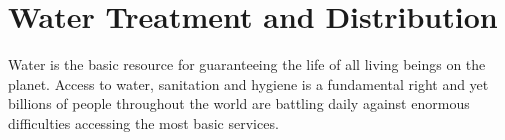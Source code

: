 
\chapter{Water Treatment and Distribution}



Water is the basic resource for guaranteeing the life of all living beings on the planet. Access to water, sanitation and hygiene is a fundamental right and yet billions of people throughout the world are battling daily against enormous difficulties accessing the most basic services.\\

